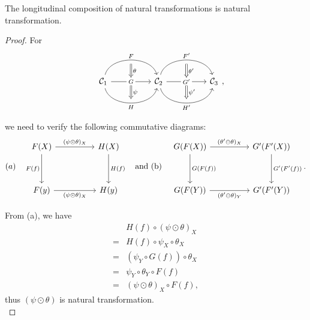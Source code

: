 \documentclass{article}
\begin{document}
\begin{thm}
	The longitudinal composition of natural transformations is natural transformation.	
\end{thm}
\begin{proof}
	For
	\[\quad\begin{tikzcd}
		\mathcal{C}_1
		\arrow[bend left=75, rr, "F", ""' name=F] \arrow[rr, "G" description, "" name=G, ""' name=GG] \arrow[bend right=75, rr, "H"', "" name=H] & &
		\arrow[Rightarrow, from=F, to=G, "\theta"] \arrow[Rightarrow, from=GG, to=H, "\psi"]
		\mathcal{C}_2 \arrow[bend left=75, rr, "F'", ""' name=F'] \arrow[rr, "G'" description, "" name=G', ""' name=GG'] \arrow[bend right=75, rr, "H'"', "" name=H'] & &
		\arrow[Rightarrow, from=F', to=G', "\theta'"] \arrow[Rightarrow, from=GG', to=H', "\psi'"] \mathcal{C}_3
	\end{tikzcd},\]
	
	we need to verify the following commutative diagrams:
		\[(a)\quad\begin{tikzcd}
			F(X) \arrow[dd,"F(f)"'] \arrow[rr,"(\psi\odot\theta)_X"] && H(X) \arrow[dd,"H(f)"] \\ && \\
			F(y) \arrow[rr,"(\psi\odot\theta)_X"'] && H(y)
		\end{tikzcd}\quad\text{and (b)}\quad\begin{tikzcd}
			G(F(X)) \arrow[dd,"G(F(f))"] \arrow[rr,"(\theta'\ominus\theta)_X"] && G'(F'(X)) \arrow[dd,"G'(F'(f))"] \\ && \\
			G(F(Y)) \arrow[rr,"(\theta'\ominus\theta)_Y"'] && G'(F'(Y))
		\end{tikzcd}.\]
		
		From (a), we have
		\begin{align}\label{(a)}
			 & H(f)\circ(\psi\odot\theta)_X\tag{Assumption}\\
			=& H(f)\circ\psi_X\circ\theta_X\tag{Definition of longitudinal composition}\\
			=& (\psi_Y\circ G(f))\circ\theta_X\tag{Property of natural transformation $\psi$}\\
			=& \psi_Y\circ\theta_Y\circ F(f)\tag{Property of natural transformation $\theta$}\\
			=& (\psi\odot\theta)_X\circ F(f),\tag{Definition of longitudinal composition}
		\end{align}
		thus $(\psi\odot\theta)$ is natural transformation.\\
		

\end{proof}
\end{document}
